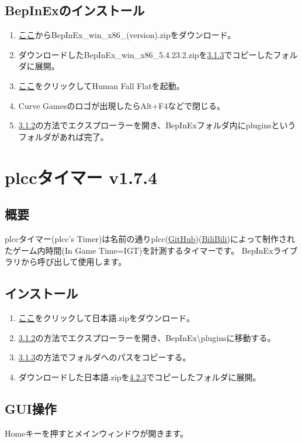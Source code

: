 \documentclass[lualatex,a4paper,fontsize=11pt,jafontscale=0.9247,titlepage,oneside]{jlreq}
\begin{document}
\subsection{BepInExのインストール}
\begin{enumerate}
\item \href{https://github.com/BepInEx/BepInEx/releases/latest}{ここ}からBepInEx\_win\_x86\_(version).zipをダウンロード。
\item ダウンロードしたBepInEx\_win\_x86\_5.4.23.2.zipを\hyperref[3.1.3]{3.1.3}でコピーしたフォルダに展開。
\item \href{steam://rungameid/477160}{ここ}をクリックしてHuman Fall Flatを起動。
\item Curve Gamesのロゴが出現したらAlt+F4などで閉じる。
\item \hyperref[3.1.2]{3.1.2}の方法でエクスプローラーを開き、BepInExフォルダ内にpluginsというフォルダがあれば完了。
\end{enumerate}
\section{plccタイマー v1.7.4}
\subsection{概要}
plccタイマー(plcc's Timer)は名前の通りplcc(\href{https://github.com/plcc0}{GitHub})(\href{https://space.bilibili.com/111277972}{BiliBili})によって制作されたゲーム内時間(In Game Time=IGT)を計測するタイマーです。\parr
BepInExライブラリから呼び出して使用します。
\subsection{インストール}
\begin{enumerate}   
\item \href{https://github.com/Msgame79/hffmods/raw/refs/heads/main/plcc's%20timer/1.7.4/%E6%97%A5%E6%9C%AC%E8%AA%9E.zip}{ここ}をクリックして日本語.zipをダウンロード。
\item \hyperref[3.1.2]{3.1.2}の方法でエクスプローラーを開き、BepInEx\textbackslash pluginsに移動する。
\item \label{4.2.3}\hyperref[3.1.3]{3.1.3}の方法でフォルダへのパスをコピーする。
\item ダウンロードした日本語.zipを\hyperref[4.2.3]{4.2.3}でコピーしたフォルダに展開。
\end{enumerate}
\subsection{GUI操作}
Homeキーを押すとメインウィンドウが開きます。
\end{document}
